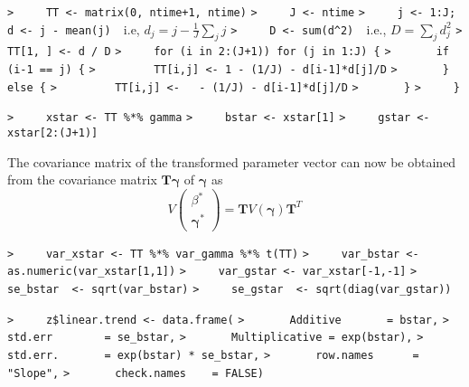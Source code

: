 \documentclass[a4paper]{article}
\begin{document}
\verb~>     TT <- matrix(0, ntime+1, ntime)~\newline
\verb~>     J <- ntime~\newline
\verb~>     j <- 1:J; d <- j - mean(j)  ~{\sffamily i.e, $ d_j = j-\frac{1}{J}\sum_j j$}\newline
\verb~>     D <- sum(d^2)  ~{\sffamily i.e., $ D = \sum_j d_j^2$}\newline
\verb~>     TT[1, ] <- d / D~\newline
\verb~>     for (i in 2:(J+1)) for (j in 1:J) {~\newline
\verb~>       if (i-1 == j) {~\newline
\verb~>         TT[i,j] <- 1 - (1/J) - d[i-1]*d[j]/D~\newline
\verb~>       } else {~\newline
\verb~>         TT[i,j] <-   - (1/J) - d[i-1]*d[j]/D~\newline
\verb~>       }~\newline
\verb~>     }~\par

\verb~>     xstar <- TT %*% gamma~\newline
\verb~>     bstar <- xstar[1]~\newline
\verb~>     gstar <- xstar[2:(J+1)]~\par

The covariance matrix of the transformed parameter vector can now be obtained
from the covariance matrix $\mathbf{T}\boldsymbol{\gamma}$ of $\boldsymbol{\gamma}$ as
\begin{equation}
  V\left( \begin{array} {c} \beta^* \\\boldsymbol{\gamma}^* \end{array} \right)
  = \mathbf{T}V(\boldsymbol{\gamma})\mathbf{T}^T
\end{equation}\par

\verb~>     var_xstar <- TT %*% var_gamma %*% t(TT)~\newline
\verb~>     var_bstar <- as.numeric(var_xstar[1,1])~\newline
\verb~>     var_gstar <- var_xstar[-1,-1]~\newline
\verb~>     se_bstar  <- sqrt(var_bstar)~\newline
\verb~>     se_gstar  <- sqrt(diag(var_gstar))~\par

\verb~>     z$linear.trend <- data.frame(~\newline
\verb~>       Additive       = bstar,~\newline
\verb~>       std.err        = se_bstar,~\newline
\verb~>       Multiplicative = exp(bstar),~\newline
\verb~>       std.err.       = exp(bstar) * se_bstar,~\newline
\verb~>       row.names      = "Slope",~\newline
\verb~>       check.names    = FALSE)~\par
\end{document}
